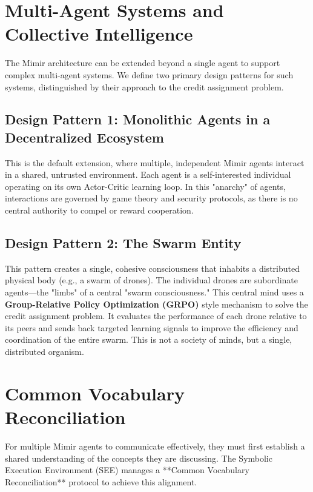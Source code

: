\documentclass{article}
\begin{document}
\section{Multi-Agent Systems and Collective Intelligence}

The Mimir architecture can be extended beyond a single agent to support complex multi-agent systems. We define two primary design patterns for such systems, distinguished by their approach to the credit assignment problem.

\subsection{Design Pattern 1: Monolithic Agents in a Decentralized Ecosystem}
This is the default extension, where multiple, independent Mimir agents interact in a shared, untrusted environment. Each agent is a self-interested individual operating on its own Actor-Critic learning loop. In this "anarchy" of agents, interactions are governed by game theory and security protocols, as there is no central authority to compel or reward cooperation.

\subsection{Design Pattern 2: The Swarm Entity}
This pattern creates a single, cohesive consciousness that inhabits a distributed physical body (e.g., a swarm of drones). The individual drones are subordinate agents---the "limbs" of a central "swarm consciousness." This central mind uses a \textbf{Group-Relative Policy Optimization (GRPO)} style mechanism to solve the credit assignment problem. It evaluates the performance of each drone relative to its peers and sends back targeted learning signals to improve the efficiency and coordination of the entire swarm. This is not a society of minds, but a single, distributed organism.

\section{Common Vocabulary Reconciliation}

For multiple Mimir agents to communicate effectively, they must first establish a shared understanding of the concepts they are discussing. The Symbolic Execution Environment (SEE) manages a **Common Vocabulary Reconciliation** protocol to achieve this alignment.
\end{document}
